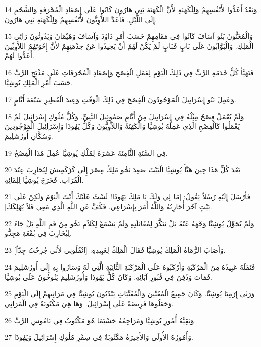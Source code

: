 \par 14 وَبَعْدُ أَعَدُّوا لأَنْفُسِهِمْ وَلِلْكَهَنَةِ لأَنَّ الْكَهَنَةَ بَنِي هَارُونَ كَانُوا عَلَى إِصْعَادِ الْمُحْرَقَةِ وَالشَّحْمِ إِلَى اللَّيْلِ. فَأَعَدَّ اللاَّوِيُّونَ لأَنْفُسِهِمْ وَلِلْكَهَنَةِ بَنِي هَارُونَ.
\par 15 وَالْمُغَنُّونَ بَنُو آسَافَ كَانُوا فِي مَقَامِهِمْ حَسَبَ أَمْرِ دَاوُدَ وَآسَافَ وَهَيْمَانَ وَيَدُوثُونَ رَائِي الْمَلِكِ. وَالْبَوَّابُونَ عَلَى بَابٍ فَبَابٍ لَمْ يَكُنْ لَهُمْ أَنْ يَحِيدُوا عَنْ خِدْمَتِهِمْ لأَنَّ إِخْوَتَهُمُ اللاَّوِيِّينَ أَعَدُّوا لَهُمْ.
\par 16 فَتَهَيَّأَ كُلُّ خَدَمَةِ الرَّبِّ فِي ذَلِكَ الْيَوْمِ لِعَمَلِ الْفِصْحِ وَإِصْعَادِ الْمُحْرَقَاتِ عَلَى مَذْبَحِ الرَّبِّ حَسَبَ أَمْرِ الْمَلِكِ يُوشِيَّا.
\par 17 وَعَمِلَ بَنُو إِسْرَائِيلَ الْمَوْجُودُونَ الْفِصْحَ فِي ذَلِكَ الْوَقْتِ وَعِيدَ الْفَطِيرِ سَبْعَةَ أَيَّامٍ.
\par 18 وَلَمْ يُعْمَلْ فِصْحٌ مِثْلُهُ فِي إِسْرَائِيلَ مِنْ أَيَّامِ صَمُوئِيلَ النَّبِيِّ. وَكُلُّ مُلُوكِ إِسْرَائِيلَ لَمْ يَعْمَلُوا كَالْفِصْحِ الَّذِي عَمِلَهُ يُوشِيَّا وَالْكَهَنَةُ وَاللاَّوِيُّونَ وَكُلُّ يَهُوذَا وَإِسْرَائِيلَ الْمَوْجُودِينَ وَسُكَّانِ أُورُشَلِيمَ.
\par 19 فِي السَّنَةِ الثَّامِنَةَ عَشَرَةَ لِمُلْكِ يُوشِيَّا عُمِلَ هَذَا الْفِصْحُ.
\par 20 بَعْدَ كُلِّ هَذَا حِينَ هَيَّأَ يُوشِيَّا الْبَيْتَ صَعِدَ نَخُو مَلِكُ مِصْرَ إِلَى كَرْكَمِيشَ لِيُحَارِبَ عِنْدَ الْفُرَاتِ. فَخَرَجَ يُوشِيَّا لِلِقَائِهِ.
\par 21 فَأَرْسَلَ إِلَيْهِ رُسُلاً يَقُولُ: [مَا لِي وَلَكَ يَا مَلِكَ يَهُوذَا! لَسْتُ عَلَيْكَ أَنْتَ الْيَوْمَ وَلَكِنْ عَلَى بَيْتٍ آخَرَ أُحَارِبُهُ وَاللَّهُ أَمَرَ بِإِسْرَاعِي. فَكُفَّ عَنِ اللَّهِ الَّذِي مَعِي فَلاَ يُهْلِكَكَ].
\par 22 وَلَمْ يُحَوِّلْ يُوشِيَّا وَجْهَهُ عَنْهُ بَلْ تَنَكَّرَ لِمُقَاتَلَتِهِ وَلَمْ يَسْمَعْ لِكَلاَمِ نَخُو مِنْ فَمِ اللَّهِ بَلْ جَاءَ لِيُحَارِبَ فِي بُقْعَةِ مَجِدُّو.
\par 23 وَأَصَابَ الرُّمَاةُ الْمَلِكَ يُوشِيَّا فَقَالَ الْمَلِكُ لِعَبِيدِهِ: [انْقُلُونِي لأَنِّي جُرِحْتُ جِدّاً].
\par 24 فَنَقَلَهُ عَبِيدُهُ مِنَ الْمَرْكَبَةِ وَأَرْكَبُوهُ عَلَى الْمَرْكَبَةِ الثَّانِيَةِ الَّتِي لَهُ وَسَارُوا بِهِ إِلَى أُورُشَلِيمَ فَمَاتَ وَدُفِنَ فِي قُبُورِ آبَائِهِ. وَكَانَ كُلُّ يَهُوذَا وَأُورُشَلِيمَ يَنُوحُونَ عَلَى يُوشِيَّا.
\par 25 وَرَثَى إِرْمِيَا يُوشِيَّا. وَكَانَ جَمِيعُ الْمُغَنِّينَ وَالْمُغَنِّيَاتِ يَنْدُبُونَ يُوشِيَّا فِي مَرَاثِيهِمْ إِلَى الْيَوْمِ وَجَعَلُوهَا فَرِيضَةً عَلَى إِسْرَائِيلَ. وَهَا هِيَ مَكْتُوبَةٌ فِي الْمَرَاثِي.
\par 26 وَبَقِيَّةُ أُمُورِ يُوشِيَّا وَمَرَاحِمُهُ حَسْبَمَا هُوَ مَكْتُوبٌ فِي نَامُوسِ الرَّبِّ.
\par 27 وَأُمُورُهُ الأُولَى وَالأَخِيرَةُ مَكْتُوبَةٌ فِي سِفْرِ مُلُوكِ إِسْرَائِيلَ وَيَهُوذَا.

